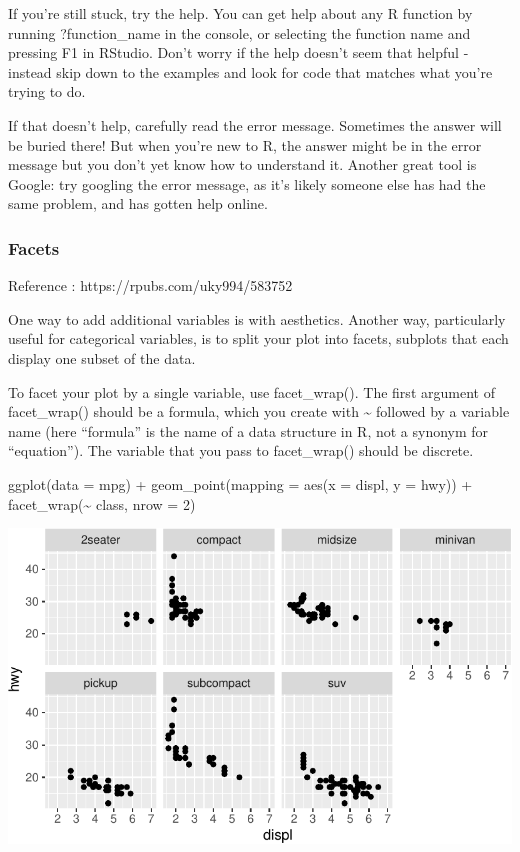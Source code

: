 \documentclass[
  letterpaper,
  DIV=11,
  numbers=noendperiod]{scrreprt}
\newenvironment{Shaded}{\begin{snugshade}}{\end{snugshade}}
\newcommand{\AttributeTok}[1]{\textcolor[rgb]{0.40,0.45,0.13}{#1}}
\newcommand{\DecValTok}[1]{\textcolor[rgb]{0.68,0.00,0.00}{#1}}
\newcommand{\FunctionTok}[1]{\textcolor[rgb]{0.28,0.35,0.67}{#1}}
\newcommand{\NormalTok}[1]{\textcolor[rgb]{0.00,0.23,0.31}{#1}}
\newcommand{\SpecialCharTok}[1]{\textcolor[rgb]{0.37,0.37,0.37}{#1}}
\begin{document}
If you're still stuck, try the help. You can get help about any R
function by running ?function\_name in the console, or selecting the
function name and pressing F1 in RStudio. Don't worry if the help
doesn't seem that helpful - instead skip down to the examples and look
for code that matches what you're trying to do.

If that doesn't help, carefully read the error message. Sometimes the
answer will be buried there! But when you're new to R, the answer might
be in the error message but you don't yet know how to understand it.
Another great tool is Google: try googling the error message, as it's
likely someone else has had the same problem, and has gotten help
online.

\subsubsection*{Facets}\label{facets}

Reference : https://rpubs.com/uky994/583752

One way to add additional variables is with aesthetics. Another way,
particularly useful for categorical variables, is to split your plot
into facets, subplots that each display one subset of the data.

To facet your plot by a single variable, use facet\_wrap(). The first
argument of facet\_wrap() should be a formula, which you create with
\textasciitilde{} followed by a variable name (here ``formula'' is the
name of a data structure in R, not a synonym for ``equation''). The
variable that you pass to facet\_wrap() should be discrete.

\begin{Shaded}
\begin{Highlighting}[]
\FunctionTok{ggplot}\NormalTok{(}\AttributeTok{data =}\NormalTok{ mpg) }\SpecialCharTok{+} 
  \FunctionTok{geom\_point}\NormalTok{(}\AttributeTok{mapping =} \FunctionTok{aes}\NormalTok{(}\AttributeTok{x =}\NormalTok{ displ, }\AttributeTok{y =}\NormalTok{ hwy)) }\SpecialCharTok{+} 
  \FunctionTok{facet\_wrap}\NormalTok{(}\SpecialCharTok{\textasciitilde{}}\NormalTok{ class, }\AttributeTok{nrow =} \DecValTok{2}\NormalTok{)}
\end{Highlighting}
\end{Shaded}

\includegraphics{Beginning_Data_Visualization_files/figure-pdf/Example 6-1.pdf}
\end{document}
